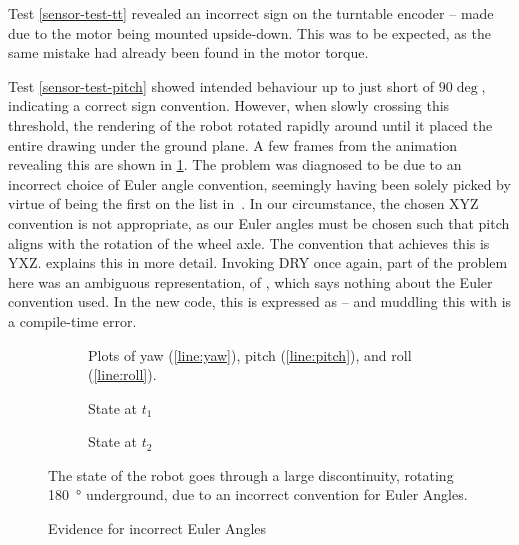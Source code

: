 \documentclass[main.tex]{subfiles}
\begin{document}
		Test \ref{sensor-test-tt} revealed an incorrect sign on the turntable encoder -- made due to the motor being mounted upside-down.
		This was to be expected, as the same mistake had already been found in the motor torque.

		Test \ref{sensor-test-pitch} showed intended behaviour up to just short of $90\deg$, indicating a correct sign convention.
		However, when slowly crossing this threshold, the rendering of the robot rotated rapidly around until it placed the entire drawing under the ground plane.
		A few frames from the animation revealing this are shown in \cref{fig:bad-euler}.
		The problem was diagnosed to be due to an incorrect choice of Euler angle convention, seemingly having been solely picked by virtue of being the first on the list in~\cite{diebel2006representing}.
		In our circumstance, the chosen XYZ convention is not appropriate, as our Euler angles must be chosen such that pitch aligns with the rotation of the wheel axle. The convention that achieves this is YXZ.
		 explains this in more detail.
		Invoking DRY once again, part of the problem here was an ambiguous representation, of , which says nothing about the Euler convention used.
		In the new code, this is expressed as  -- and muddling this with  is a compile-time error.

		\begin{figure}
			\centering
			\begin{subfigure}[t]{0.333\linewidth-2em}
				
				\caption{
					Plots of yaw (\ref{line:yaw}), pitch (\ref{line:pitch}), and roll (\ref{line:roll}).
				}
			\end{subfigure}\hfill
			\begin{subfigure}[t]{0.333\linewidth-2em}
				
				\caption{State at $t_1$}
			\end{subfigure}\hfill
			\begin{subfigure}[t]{0.333\linewidth-2em}
				
				\caption{State at $t_2$}
			\end{subfigure}
			\caption{Evidence for incorrect Euler Angles}
			\label{fig:bad-euler}
			\medskip
			\small
			The state of the robot goes through a large discontinuity, rotating \SI{180}{\degree} underground, due to an incorrect convention for Euler Angles.
		\end{figure}
\end{document}
